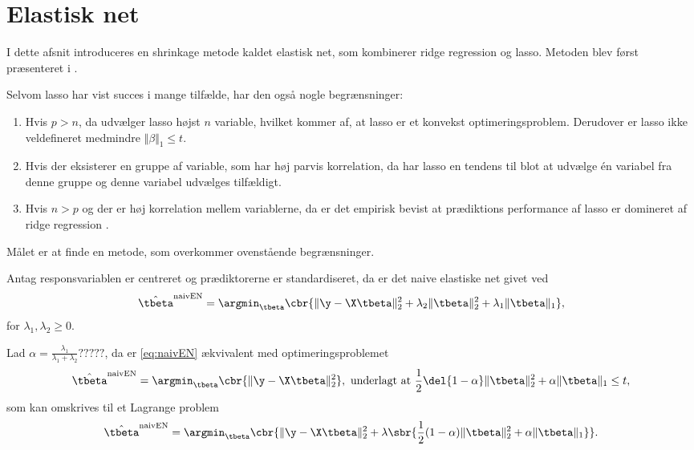 \section{Elastisk net}
I dette afsnit introduceres en shrinkage metode kaldet elastisk net, som kombinerer ridge regression og lasso.
Metoden blev først præsenteret i \citep{zou_hastie}.

Selvom lasso har vist succes i mange tilfælde, har den også nogle begrænsninger:
%
\begin{enumerate}[label=\textnormal{(\arabic*)}]
    \item Hvis $p>n$, da udvælger lasso højst $n$ variable, hvilket kommer af, at lasso er et konvekst optimeringsproblem. Derudover er lasso ikke veldefineret medmindre \(\Vert \beta \Vert_1 \leq t\). \label{itm:1}
    \item Hvis der eksisterer en gruppe af variable, som har høj parvis korrelation, da har lasso en tendens til blot at udvælge  én variabel fra denne gruppe og denne variabel udvælges tilfældigt. \label{itm:2}
    \item Hvis $n>p$ og der er høj korrelation mellem variablerne, da er det empirisk bevist at prædiktions performance af lasso er domineret af ridge regression \citep{lasso}.  \label{itm:3}
\end{enumerate}
%
Målet er at finde en metode, som overkommer ovenstående begrænsninger.
%
\begin{defn}
Antag responsvariablen er centreret og prædiktorerne er standardiseret, da er det naive elastiske net givet ved
\begin{align}
\hat{\tbeta}^\text{naivEN} = \argmin_{\tbeta} \cbr{\Vert \y - \X \tbeta \Vert_2^2 + \lambda_2 \Vert \tbeta \Vert_2^2 + \lambda_1 \Vert \tbeta \Vert_1}, \label{eq:naivEN}
\end{align}
for \(\lambda_1, \lambda_2 \geq 0\).
\end{defn}
%
Lad \(\alpha = \frac{\lambda_1}{\lambda_1 + \lambda_2}?????\), da er \eqref{eq:naivEN} ækvivalent med optimeringsproblemet
\begin{align*}
\hat{\tbeta}^\text{naivEN} = \argmin_{\tbeta} \cbr{\Vert \y - \X \tbeta \Vert_2^2}, \ \text{underlagt at } \frac{1}{2}\del{1-\alpha} \Vert \tbeta \Vert_2^2 + \alpha \Vert \tbeta \Vert_1 \leq t,
\end{align*}
som kan omskrives til et Lagrange problem
\begin{align}
\hat{\tbeta}^\text{naivEN} =\argmin_{\tbeta} \cbr{ \Vert \y - \X \tbeta \Vert_2^2 + \lambda \sbr{\frac{1}{2}(1- \alpha) \Vert \tbeta \Vert_2^2 + \alpha \Vert \tbeta \Vert_1}}. \label{eq:4.2}
\end{align}
